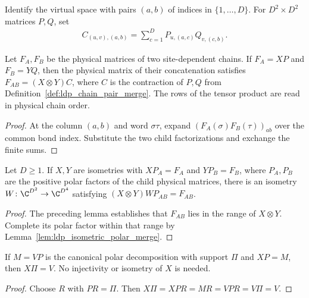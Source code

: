 \begin{definition}
    \label{def:ldp_chain_pair_merge}
    \leanok
    Identify the virtual space with pairs $(a,b)$ of indices in
    $\{1,\ldots,D\}$. For $D^2\times D^2$ matrices $P,Q$, set
    \begin{align*}
        C_{(u,v),(a,b)}
        =\sum_{c=1}^D P_{u,(a,c)}Q_{v,(c,b)}.
    \end{align*}
\end{definition}

\begin{lemma}
    \label{lem:ldp_chain_pair_append_factorization}
    \leanok
    Let $F_A,F_B$ be the physical matrices of two site-dependent chains.
    If $F_A=XP$ and $F_B=YQ$, then the physical matrix of their
    concatenation satisfies $F_{AB}=(X\otimes Y)C$, where $C$ is the
    contraction of $P,Q$ from Definition~\ref{def:ldp_chain_pair_merge}.
    The rows of the tensor product are read in physical chain order.
\end{lemma}
\begin{proof}\leanok
    At the column $(a,b)$ and word $\sigma\tau$, expand
    $(F_A(\sigma)F_B(\tau))_{ab}$ over the common bond index.
    Substitute the two child factorizations and exchange the finite sums.
\end{proof}

\begin{lemma}
    \label{lem:ldp_chain_pair_actual_merge}
    \leanok
    Let $D\ge1$. If $X,Y$ are isometries with
    $XP_A=F_A$ and $YP_B=F_B$, where $P_A,P_B$ are the positive polar
    factors of the child physical matrices, there is an isometry
    $W\colon\C^{D^2}\to\C^{D^4}$ satisfying
    $(X\otimes Y)WP_{AB}=F_{AB}$.
\end{lemma}
\begin{proof}\leanok
    The preceding lemma establishes that $F_{AB}$ lies in the range of
    $X\otimes Y$. Complete its polar factor within that range by
    Lemma~\ref{lem:ldp_isometric_polar_merge}.
\end{proof}

\begin{lemma}
    \label{lem:ldp_factor_agrees_on_polar_support}
    \leanok
    If $M=VP$ is the canonical polar decomposition with support $\Pi$
    and $XP=M$, then $X\Pi=V$. No injectivity or isometry of $X$ is needed.
\end{lemma}
\begin{proof}\leanok
    Choose $R$ with $PR=\Pi$. Then
    $X\Pi=XPR=MR=VPR=V\Pi=V$.
\end{proof}

